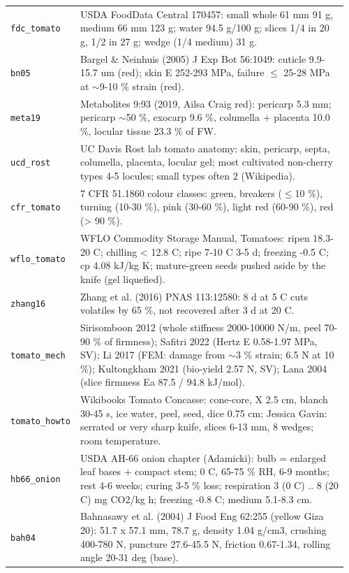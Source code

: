 \documentclass[10.5pt,a4paper]{article}
\begin{document}
{\begin{longtable}{@{}p{0.16\linewidth}p{0.8\linewidth}@{}}
\texttt{fdc\_\allowbreak{}tomato} & USDA FoodData Central 170457: small whole 61 mm 91 g, medium 66 mm 123 g; water 94.5 g/100 g; slices 1/4 in 20 g, 1/2 in 27 g; wedge (1/4 medium) 31 g. \\
\texttt{bn05} & Bargel \& Neinhuis (2005) J Exp Bot 56:1049: cuticle 9.9-15.7 um (red); skin E 252-293 MPa, failure $\le$ 25-28 MPa at $\sim$9-10 \% strain (red). \\
\texttt{meta19} & Metabolites 9:93 (2019, Ailsa Craig red): pericarp 5.3 mm; pericarp $\sim$50 \%, exocarp 9.6 \%, columella + placenta 10.0 \%, locular tissue 23.3 \% of FW. \\
\texttt{ucd\_\allowbreak{}rost} & UC Davis Rost lab tomato anatomy: skin, pericarp, septa, columella, placenta, locular gel; most cultivated non-cherry types 4-5 locules; small types often 2 (Wikipedia). \\
\texttt{cfr\_\allowbreak{}tomato} & 7 CFR 51.1860 colour classes: green, breakers ($\le$10 \%), turning (10-30 \%), pink (30-60 \%), light red (60-90 \%), red (> 90 \%). \\
\texttt{wflo\_\allowbreak{}tomato} & WFLO Commodity Storage Manual, Tomatoes: ripen 18.3-20 C; chilling < 12.8 C; ripe 7-10 C 3-5 d; freezing -0.5 C; cp 4.08 kJ/kg K; mature-green seeds pushed aside by the knife (gel liquefied). \\
\texttt{zhang16} & Zhang et al. (2016) PNAS 113:12580: 8 d at 5 C cuts volatiles by 65 \%, not recovered after 3 d at 20 C. \\
\texttt{tomato\_\allowbreak{}mech} & Sirisomboon 2012 (whole stiffness 2000-10000 N/m, peel 70-90 \% of firmness); Safitri 2022 (Hertz E 0.58-1.97 MPa, SV); Li 2017 (FEM: damage from $\sim$3 \% strain; 6.5 N at 10 \%); Kultongkham 2021 (bio-yield 2.57 N, SV); Lana 2004 (slice firmness Ea 87.5 / 94.8 kJ/mol). \\
\texttt{tomato\_\allowbreak{}howto} & Wikibooks Tomato Concasse: cone-core, X 2.5 cm, blanch 30-45 s, ice water, peel, seed, dice 0.75 cm; Jessica Gavin: serrated or very sharp knife, slices 6-13 mm, 8 wedges; room temperature. \\
\texttt{hb66\_\allowbreak{}onion} & USDA AH-66 onion chapter (Adamicki): bulb = enlarged leaf bases + compact stem; 0 C, 65-75 \% RH, 6-9 months; rest 4-6 weeks; curing 3-5 \% loss; respiration 3 (0 C) .. 8 (20 C) mg CO2/kg h; freezing -0.8 C; medium 5.1-8.3 cm. \\
\texttt{bah04} & Bahnasawy et al. (2004) J Food Eng 62:255 (yellow Giza 20): 51.7 x 57.1 mm, 78.7 g, density 1.04 g/cm3, crushing 400-780 N, puncture 27.6-45.5 N, friction 0.67-1.34, rolling angle 20-31 deg (base). \\

\end{longtable}}
\end{document}
